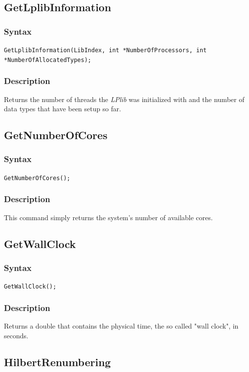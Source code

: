 \documentclass[a4paper,12pt]{article}
\begin{document}
\subsection{GetLplibInformation}

\subsubsection*{Syntax}
\tt{GetLplibInformation(LibIndex, int *NumberOfProcessors, int *NumberOfAllocatedTypes);}
\normalfont

\subsubsection*{Description}
Returns the number of threads the \emph{LPlib} was initialized with and the number of data types that have been setup so far.


\subsection{GetNumberOfCores}

\subsubsection*{Syntax}
\tt{GetNumberOfCores();}
\normalfont

\subsubsection*{Description}
This command simply returns the system's number of available cores.

\subsection{GetWallClock}

\subsubsection*{Syntax}
\tt{GetWallClock();}
\normalfont

\subsubsection*{Description}
Returns a double that contains the physical time, the so called "wall clock", in seconds.

\subsection{HilbertRenumbering}
\end{document}
